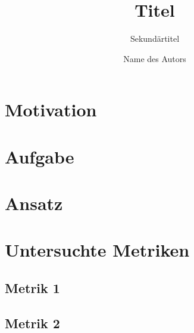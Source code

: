 \documentclass[fontsize=11pt,%
               paper=a4,%
               DIV=15]{scrartcl}
\title{Titel}
\subtitle{Sekundärtitel}
\author{Name des Autors}
\begin{document}
\maketitle

\section*{Motivation}
\blindtext
\cite{rfc1337}
\section*{Aufgabe}
\blindtext

\section*{Ansatz}
\blindtext

\section*{Untersuchte Metriken}
\blindtext

\subsection*{Metrik 1}
\blindtext

\subsection*{Metrik 2}
\blindtext





\end{document}
